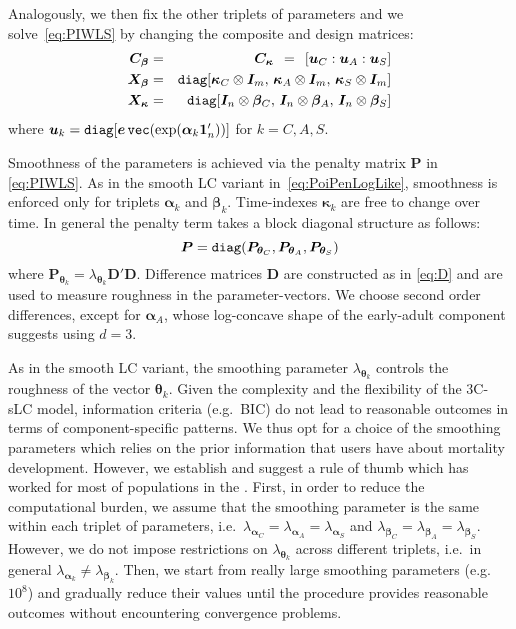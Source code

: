 \documentclass[Thesis]{subfiles}
\begin{document}
Analogously, we then fix the other triplets of parameters and we solve~\eqref{eq:PIWLS} by changing the composite and design matrices:
\begin{eqnarray}\label{eq:CXbetakappa}\nonumber
\bm{C}_{\bm{\beta}} &=& \bm{C}_{\bm{\kappa}} \;\,=\;\, [\bm{u}_{C}: \bm{u}_{A} :
\bm{u}_{S}]\nonumber\\
\bm{X}_{\bm{\beta}} &=& \verb"diag"[ \bm{\kappa}_{C}\otimes \bm{I}_{m},\,
\bm{\kappa}_{A}\otimes \bm{I}_{m}, \,\bm{\kappa}_{S}\otimes \bm{I}_{m}
]\\\nonumber
\bm{X}_{\bm{\kappa}} &=& \verb"diag"[ \bm{I}_{n} \otimes
\bm{\beta}_{C},\, \bm{I}_{n} \otimes \bm{\beta}_{A},\, \bm{I}_{n} \otimes \bm{\beta}_{S}]
\end{eqnarray}
where $\bm{u}_{k} = \verb"diag"[\bm{e}\,
\verb"vec"(\exp(\bm{\alpha}_{k} \bm{1}_{n}'))]$ for
$k=C,A,S$. 

Smoothness of the parameters is achieved via the penalty matrix $\bm{P}$ in \eqref{eq:PIWLS}. As in the smooth LC variant in~\eqref{eq:PoiPenLogLike}, smoothness is enforced only for triplets $\bm{\alpha}_{k}$ and $\bm{\beta}_{k}$. Time-indexes $\bm{\kappa}_{k}$ are free to change over time. In general the penalty term takes a block diagonal structure as follows:
\begin{equation}\label{eq:Penalty}
\bm{P} = \verb"diag"(\bm{P}_{\bm{\theta}_{C}}, \bm{P}_{\bm{\theta}_{A}}, \bm{P}_{\bm{\theta}_{S}})
\end{equation}
where $\bm{P}_{\bm{\theta}_{k}} = \lambda_{\bm{\theta}_{k}}\bm{D}'\bm{D}$. Difference matrices $\bm{D}$ are constructed as in \eqref{eq:D} and are used to measure roughness in the parameter-vectors. We choose second order differences, except for $\bm{\alpha}_{A}$, whose log-concave shape of the early-adult component suggests using $d=3$.

As in the smooth LC variant, the smoothing parameter $\lambda_{\bm{\theta}_{k}}$ controls the roughness of the vector $\bm{\theta}_{k}$. Given the complexity and the flexibility of the 3C-sLC model, information criteria (e.g.~BIC) do not lead to reasonable outcomes in terms of component-specific patterns. We thus opt for a choice of the smoothing parameters which relies on the prior information that users have about mortality development. However, we establish and suggest a rule of thumb which has worked for most of populations in the \cite{HMD}. First, in order to reduce the computational burden, we assume that the smoothing parameter is the same within each triplet of parameters, i.e.~$\lambda_{\bm{\alpha}_{C}}=\lambda_{\bm{\alpha}_{A}}=\lambda_{\bm{\alpha}_{S}}$ and $\lambda_{\bm{\beta}_{C}}=\lambda_{\bm{\beta}_{A}}=\lambda_{\bm{\beta}_{S}}$. However, we do not impose restrictions on $\lambda_{\bm{\theta}_{k}}$ across different
triplets, i.e.~in general $\lambda_{\bm{\alpha}_{k}}\neq \lambda_{\bm{\beta}_{k}}$. Then, we start from really large smoothing parameters (e.g.~$10^8$) and gradually reduce their values until the procedure provides reasonable outcomes without encountering convergence problems. 
\end{document}

